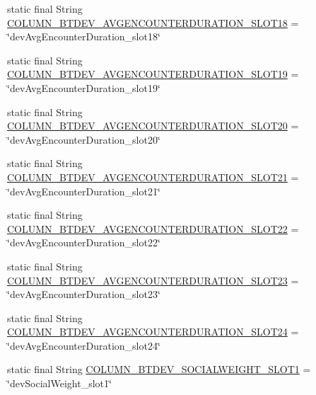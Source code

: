 \begin{DoxyCompactItemize}
\item 
static final String \hyperlink{classcom_1_1social_1_1proximity_1_1_s_q_lite_helper_a0eaf0df061e77b43c9856c68f685d483}{C\+O\+L\+U\+M\+N\+\_\+\+B\+T\+D\+E\+V\+\_\+\+A\+V\+G\+E\+N\+C\+O\+U\+N\+T\+E\+R\+D\+U\+R\+A\+T\+I\+O\+N\+\_\+\+S\+L\+O\+T18} = \char`\"{}dev\+Avg\+Encounter\+Duration\+\_\+slot18\char`\"{}
\item 
static final String \hyperlink{classcom_1_1social_1_1proximity_1_1_s_q_lite_helper_ab4ea60ed82b06142cb4474db3604c1a7}{C\+O\+L\+U\+M\+N\+\_\+\+B\+T\+D\+E\+V\+\_\+\+A\+V\+G\+E\+N\+C\+O\+U\+N\+T\+E\+R\+D\+U\+R\+A\+T\+I\+O\+N\+\_\+\+S\+L\+O\+T19} = \char`\"{}dev\+Avg\+Encounter\+Duration\+\_\+slot19\char`\"{}
\item 
static final String \hyperlink{classcom_1_1social_1_1proximity_1_1_s_q_lite_helper_af6ef170145c615192e7c40fd4a9a1428}{C\+O\+L\+U\+M\+N\+\_\+\+B\+T\+D\+E\+V\+\_\+\+A\+V\+G\+E\+N\+C\+O\+U\+N\+T\+E\+R\+D\+U\+R\+A\+T\+I\+O\+N\+\_\+\+S\+L\+O\+T20} = \char`\"{}dev\+Avg\+Encounter\+Duration\+\_\+slot20\char`\"{}
\item 
static final String \hyperlink{classcom_1_1social_1_1proximity_1_1_s_q_lite_helper_a83dd830a181065c409361f4be1fe74f4}{C\+O\+L\+U\+M\+N\+\_\+\+B\+T\+D\+E\+V\+\_\+\+A\+V\+G\+E\+N\+C\+O\+U\+N\+T\+E\+R\+D\+U\+R\+A\+T\+I\+O\+N\+\_\+\+S\+L\+O\+T21} = \char`\"{}dev\+Avg\+Encounter\+Duration\+\_\+slot21\char`\"{}
\item 
static final String \hyperlink{classcom_1_1social_1_1proximity_1_1_s_q_lite_helper_aca81099d56d66abb9f3ae813dbefcf75}{C\+O\+L\+U\+M\+N\+\_\+\+B\+T\+D\+E\+V\+\_\+\+A\+V\+G\+E\+N\+C\+O\+U\+N\+T\+E\+R\+D\+U\+R\+A\+T\+I\+O\+N\+\_\+\+S\+L\+O\+T22} = \char`\"{}dev\+Avg\+Encounter\+Duration\+\_\+slot22\char`\"{}
\item 
static final String \hyperlink{classcom_1_1social_1_1proximity_1_1_s_q_lite_helper_aed5dae0c9a3e1a846edc2c7892d4ab33}{C\+O\+L\+U\+M\+N\+\_\+\+B\+T\+D\+E\+V\+\_\+\+A\+V\+G\+E\+N\+C\+O\+U\+N\+T\+E\+R\+D\+U\+R\+A\+T\+I\+O\+N\+\_\+\+S\+L\+O\+T23} = \char`\"{}dev\+Avg\+Encounter\+Duration\+\_\+slot23\char`\"{}
\item 
static final String \hyperlink{classcom_1_1social_1_1proximity_1_1_s_q_lite_helper_a6a0c6049d9504d4a7e49b192b5c90a69}{C\+O\+L\+U\+M\+N\+\_\+\+B\+T\+D\+E\+V\+\_\+\+A\+V\+G\+E\+N\+C\+O\+U\+N\+T\+E\+R\+D\+U\+R\+A\+T\+I\+O\+N\+\_\+\+S\+L\+O\+T24} = \char`\"{}dev\+Avg\+Encounter\+Duration\+\_\+slot24\char`\"{}
\item 
static final String \hyperlink{classcom_1_1social_1_1proximity_1_1_s_q_lite_helper_adfc6730a2f078bba8844101b011fc377}{C\+O\+L\+U\+M\+N\+\_\+\+B\+T\+D\+E\+V\+\_\+\+S\+O\+C\+I\+A\+L\+W\+E\+I\+G\+H\+T\+\_\+\+S\+L\+O\+T1} = \char`\"{}dev\+Social\+Weight\+\_\+slot1\char`\"{}

\end{DoxyCompactItemize}
